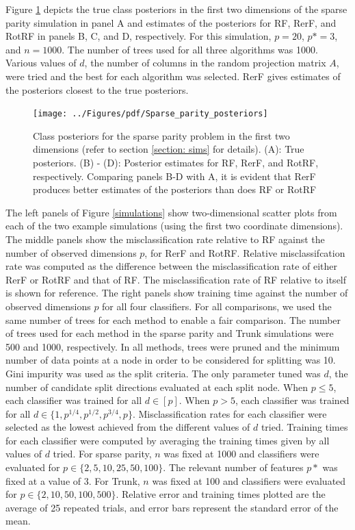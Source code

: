 \documentclass{article}
\begin{document}
Figure \ref{posteriors} depicts the true class posteriors in the first two dimensions of the sparse parity simulation in panel A and estimates of the posteriors for RF, RerF, and RotRF in panels B, C, and D, respectively. For this simulation, $p = 20$, $p* = 3$, and $n = 1000$. The number of trees used for all three algorithms was 1000. Various values of $d$, the number of columns in the random projection matrix $A$, were tried and the best for each algorithm was selected. RerF gives estimates of the posteriors closest to the true posteriors. 

\begin{figure}[ht]
\vskip 0.2in
\begin{center}
\centerline{\texttt{[image: ../Figures/pdf/Sparse\_parity\_posteriors]}}
\caption{Class posteriors for the sparse parity problem in the first two dimensions (refer to section \ref{section: sims} for details). (A): True posteriors. (B) - (D): Posterior estimates for RF, RerF, and RotRF, respectively. Comparing panels B-D with A, it is evident that RerF produces better estimates of the posteriors than does RF or RotRF}
\label{posteriors}
\end{center}
\vskip -0.2in
\end{figure}

The left panels of Figure \ref{simulations} show two-dimensional scatter plots from each of the two example simulations (using the first two coordinate dimensions). The middle panels show the misclassification rate relative to RF against the number of observed dimensions $p$, for RerF and RotRF. Relative misclassifcation rate was computed as the difference between the misclassification rate of either RerF or RotRF and that of RF. The misclassification rate of RF relative to itself is shown for reference. The right panels show training time against the number of observed dimensions $p$ for all four classifiers. For all comparisons, we used the same number of trees for each method to enable a fair comparison. The number of trees used for each method in the sparse parity and Trunk simulations were 500 and 1000, respectively. In all methods, trees were pruned and the minimum number of data points at a node in order to be considered for splitting was 10. Gini impurity was used as the split criteria. The only parameter tuned was $d$, the number of candidate split directions evaluated at each split node. When $p \leq 5$, each classifier was trained for all $d \in [p]$. When $p > 5$, each classifier was trained for all $d \in \{1,p^{1/4},p^{1/2},p^{3/4},p\}$. Misclassification rates for each classifier were selected as the lowest achieved from the different values of $d$ tried. Training times for each classifier were computed by averaging the training times given by all values of $d$ tried. For sparse parity, $n$ was fixed at 1000 and classifiers were evaluated for $p \in \{2,5,10,25,50,100\}$. The relevant number of features $p*$ was fixed at a value of 3. For Trunk, $n$ was fixed at 100 and classifiers were evaluated for $p \in \{2,10,50,100,500\}$. Relative error and training times plotted are the average of 25 repeated trials, and error bars represent the standard error of the mean.
\end{document}
